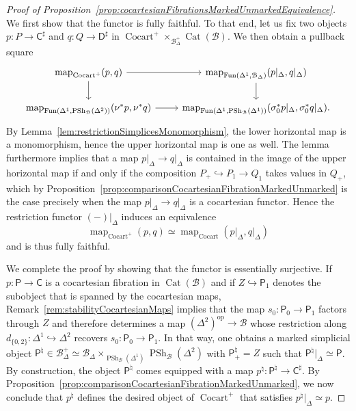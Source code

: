 \documentclass[reqno]{amsart}
\numberwithin{equation}{subsection}
\theoremstyle{plain}
\theoremstyle{definition}
\let\scr=\mathcal
\let\into=\hookrightarrow
\def\BB{\scr B}
\DeclareMathOperator{\PSh}{PSh}
\DeclareMathOperator{\Cat}{Cat}
\DeclareMathOperator{\Cocart}{Cocart}
\DeclareMathOperator{\Fun}{Fun}
\DeclareMathOperator{\Map}{map}
\newcommand{\op}{\mathrm{op}}
\newcommand{\map}[1]{\Map_{#1}}
\newcommand{\I}[1]{\mathsf{#1}}
\newcommand{\Simp}[1]{#1_{\Delta}}
\newcommand{\mSimp}[1]{#1_{\Delta}^+}
\begin{document}
\begin{proof}[{Proof of Proposition~\ref{prop:cocartesianFibrationsMarkedUnmarkedEquivalence}}]
	We first show that the functor is fully faithful. To that end, let us fix two objects $p\colon P\to \I{C}^\sharp$ and $q\colon Q\to \I{D}^\sharp$ in $\Cocart^+\times_{\mSimp\BB}\Cat(\BB)$. We then obtain a pullback square
	\begin{equation*}
	\begin{tikzcd}
	\map{\Cocart^+}(p,q)\arrow[r]\arrow[d] & \map{\Fun(\Delta^1,\Simp{\BB})}(p\vert_{\Delta}, q\vert_{\Delta})\arrow[d]\\
	\map{\Fun(\Delta^1, \PSh_{\BB}(\Delta^2))}(\nu^\ast p,\nu^\ast q)\arrow[r] & \map{\Fun(\Delta^1, \PSh_{\BB}(\Delta^1))}(\sigma_0^\ast p\vert_{\Delta}, \sigma_0^\ast q\vert_{\Delta}).
	\end{tikzcd}
	\end{equation*}
	By Lemma~\ref{lem:restrictionSimplicesMonomorphism}, the lower horizontal map is a monomorphism, hence the upper horizontal map is one as well. The lemma furthermore implies that a map $ p\vert_{\Delta}\to q\vert_\Delta$ is contained in the image of the upper horizontal map if and only if the composition $P_+\into P_1\to Q_1$ takes values in $Q_+$, which by Proposition~\ref{prop:comparisonCocartesianFibrationMarkedUnmarked} is the case precisely when the map $ p\vert_{\Delta}\to q\vert_\Delta$ is a cocartesian functor. Hence the restriction functor $(-)\vert_{\Delta}$ induces an equivalence
	\begin{equation*}
	\map{\Cocart^+}(p,q)\simeq \map{\Cocart}(p\vert_{\Delta}, q\vert_{\Delta})
	\end{equation*}
	and is thus fully faithful.
	
	We complete the proof by showing that the functor is essentially surjective. If $p\colon\I{P}\to\I{C}$ is a cocartesian fibration in $\Cat(\BB)$ and if $Z\into \I{P}_1$ denotes the subobject that is spanned by the cocartesian maps, Remark~\ref{rem:stabilityCocartesianMaps} implies that the map $s_0\colon \I{P}_0\to\I{P}_1$ factors through $Z$ and therefore determines a map $(\Delta^2)^{\op}\to \BB$ whose restriction along $d_{\{0,2\}}\colon\Delta^1\into\Delta^2$ recovers $s_0\colon\I{P}_0\to\I{P}_1$. In that way, one obtains a marked simplicial object $\I{P}^\natural\in\mSimp\BB\simeq \Simp\BB\times_{\PSh_{\BB}(\Delta^1)}\PSh_{\BB}(\Delta^2)$ with $\I{P}^\natural_+=Z$ such that $\I{P}^\natural\vert_\Delta\simeq \I{P}$. By construction, the object $\I{P}^\natural$ comes equipped with a map $p^\natural\colon\I{P}^\natural\to \I{C}^\sharp$. By Proposition~\ref{prop:comparisonCocartesianFibrationMarkedUnmarked}, we now conclude that $p^\natural$ defines the desired object of $\Cocart^+$ that satisfies $p^\natural\vert_{\Delta}\simeq p$.
\end{proof}
\end{document}
